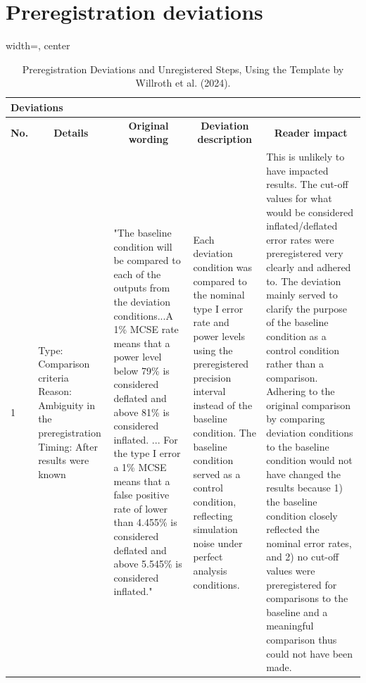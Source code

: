 \documentclass[
  man,
  floatsintext,
  longtable,
  nolmodern,
  notxfonts,
  notimes,
  colorlinks=true,linkcolor=blue,citecolor=blue,urlcolor=blue]{apa7}
\begin{document}
\appendix

\section{Preregistration
deviations}\label{apx-preregistration-deviations}

\begin{table}
\caption[Preregistration Deviations and Unregistered Steps, Using the Template by Willroth et al. (2024).]{Preregistration Deviations and Unregistered Steps, Using the Template by Willroth et al. (2024).\label{tbl-personaldeviations}}
\begin{adjustbox}{width=\textheight, center}
\scriptsize
\begin{tabular}{|p{1cm}|p{4cm}|p{4cm}|p{4cm}|p{6cm}|}

\hline
\multicolumn{5}{|l|}{\textbf{Deviations}} \\
\hline
\multicolumn{1}{|c|}{\textbf{No.}} &
\multicolumn{1}{c|}{\textbf{Details}} &
\multicolumn{1}{c|}{\textbf{Original wording}} &
\multicolumn{1}{c|}{\textbf{Deviation description}} &
\multicolumn{1}{c|}{\textbf{Reader impact}} \\
\hline
1 &
Type: Comparison criteria \newline 
Reason: Ambiguity in the preregistration \newline 
Timing: After results were known &
"The baseline condition will be compared to each of the outputs from the deviation conditions...A 1\% MCSE rate means that a power level below 79\% is considered deflated and above 81\% is considered inflated. ... For the type I error a 1\% MCSE means that a false positive rate of lower than 4.455\% is considered deflated and above 5.545\% is considered inflated." &
Each deviation condition was compared to the nominal type I error rate and power levels using the preregistered precision interval instead of the baseline condition. The baseline condition served as a control condition, reflecting simulation noise under perfect analysis conditions. &
This is unlikely to have impacted results. The cut-off values for what would be considered inflated/deflated error rates were preregistered very clearly and adhered to. The deviation mainly served to clarify the purpose of the baseline condition as a control condition rather than a comparison. Adhering to the original comparison by comparing deviation conditions to the baseline condition would not have changed the results because 1) the baseline condition closely reflected the nominal error rates, and 2) no cut-off values were preregistered for comparisons to the baseline and a meaningful comparison thus could not have been made. \\


\end{tabular}
\end{adjustbox}
\end{table}
\end{document}
